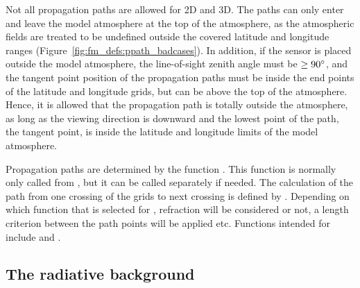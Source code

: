 Not all propagation paths are allowed for 2D and 3D. The paths can
only enter and leave the model atmosphere at the top of the
atmosphere, as the atmospheric fields are treated to be undefined
outside the covered latitude and longitude ranges
(Figure~\ref{fig:fm_defs:ppath_badcases}). In addition, if the sensor
is placed outside the model atmosphere, the line-of-sight zenith angle
must be $\geq90^\circ$, and the tangent point position of the
propagation paths must be inside the end points of the latitude and
longitude grids, but can be above the top of the atmosphere. Hence, it
is allowed that the propagation path is totally outside the
atmosphere, as long as the viewing direction is downward and the
lowest point of the path, the tangent point, is inside the latitude
and longitude limits of the model atmosphere.

Propagation paths are determined by the function .
This function is normally only called from , but it
can be called separately if needed. The calculation of the path from
one crossing of the grids to next crossing is defined by
. Depending on which function that is
selected for , refraction will be
considered or not, a length criterion between the path points will be
applied etc. Functions intended for 
include  and
.


\subsection{The radiative background}
\label{sec:fm_defs:rad_bkgr}

